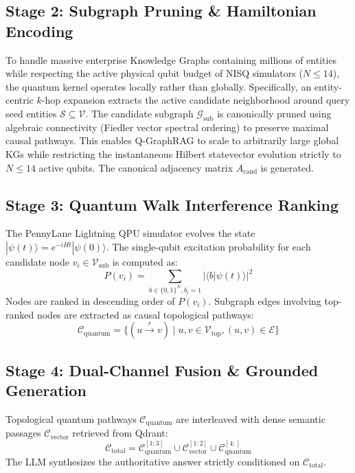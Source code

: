\documentclass[conference]{IEEEtran}
\begin{document}
\subsection{Stage 2: Subgraph Pruning \& Hamiltonian Encoding}
To handle massive enterprise Knowledge Graphs containing millions of entities while respecting the active physical qubit budget of NISQ simulators ($N \le 14$), the quantum kernel operates locally rather than globally. Specifically, an entity-centric $k$-hop expansion extracts the active candidate neighborhood around query seed entities $\mathcal{S} \subseteq \mathcal{V}$. The candidate subgraph $\mathcal{G}_{\text{sub}}$ is canonically pruned using algebraic connectivity (Fiedler vector spectral ordering) to preserve maximal causal pathways. This enables Q-GraphRAG to scale to arbitrarily large global KGs while restricting the instantaneous Hilbert statevector evolution strictly to $N \le 14$ active qubits. The canonical adjacency matrix $A_{\text{cand}}$ is generated.

\subsection{Stage 3: Quantum Walk Interference Ranking}
The PennyLane Lightning QPU simulator evolves the state $|\psi(t)\rangle = e^{-i H t} |\psi(0)\rangle$. The single-qubit excitation probability for each candidate node $v_i \in \mathcal{V}_{\text{sub}}$ is computed as:
\begin{equation}
    P(v_i) = \sum_{b \in \{0,1\}^N, b_i = 1} |\langle b | \psi(t) \rangle|^2
\end{equation}
Nodes are ranked in descending order of $P(v_i)$. Subgraph edges involving top-ranked nodes are extracted as causal topological pathways:
\begin{equation}
    \mathcal{C}_{\text{quantum}} = \{ (u \xrightarrow{r} v) \mid u, v \in \mathcal{V}_{\text{top}}, (u, v) \in \mathcal{E} \}
\end{equation}

\subsection{Stage 4: Dual-Channel Fusion \& Grounded Generation}
Topological quantum pathways $\mathcal{C}_{\text{quantum}}$ are interleaved with dense semantic passages $\mathcal{C}_{\text{vector}}$ retrieved from Qdrant:
\begin{equation}
    \mathcal{C}_{\text{total}} = \mathcal{C}_{\text{quantum}}^{[1:3]} \cup \mathcal{C}_{\text{vector}}^{[1:2]} \cup \mathcal{C}_{\text{quantum}}^{[4:]}
\end{equation}
The LLM synthesizes the authoritative answer strictly conditioned on $\mathcal{C}_{\text{total}}$.
\end{document}
